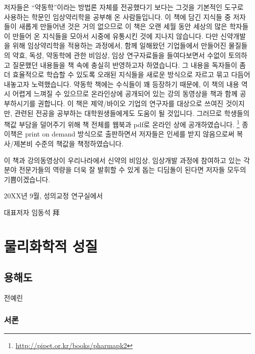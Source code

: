 \documentclass[
  11pt,
  krantz2, a4paper, twoside]{krantz}
\begin{document}
저자들은 ``약동학''이라는 방법론 자체를 전공했다기 보다는 그것을 기본적인
도구로 사용하는 학문인 임상약리학을 공부해 온 사람들입니다. 이 책에 담긴
지식들 중 저자들이 새롭게 만들어낸 것은 거의 없으므로 이 책은 오랜 세월
동안 세상의 많은 학자들이 만들어 온 지식들을 모아서 시중에 유통시킨 것에
지나지 않습니다. 다만 신약개발을 위해 임상약리학을 적용하는 과정에서,
함께 일해왔던 기업들에서 만들어진 물질들의 약효, 독성, 약동학에 관한
비임상, 임상 연구자료들을 들여다보면서 수없이 토의하고 질문했던 내용들을
책 속에 충실히 반영하고자 하였습니다. 그 내용을 독자들이 좀 더
효율적으로 학습할 수 있도록 오래된 지식들을 새로운 방식으로 자르고 묶고
다듬어 내놓고자 노력했습니다. 약동학 책에는 수식들이 꽤 등장하기 때문에, 이 책의 내용 역시 어렵게 느껴질 수 있으므로 온라인상에 공개되어 있는 강의 동영상을 책과 함께 공부하시기를 권합니다.
이 책은 제약/바이오 기업의 연구자를 대상으로 쓰여진 것이지만, 관련된 전공을 공부하는 대학원생들에게도 도움이 될 것입니다.
그러므로 학생들의 책값 부담을 덜어주기 위해 책 전체를 웹북과 pdf로 온라인 상에 공개하였습니다. \footnote{\url{http://pipet.or.kr/books/pharmapk2}}
종이책은 print on demand 방식으로 출판하면서 저자들은 인세를 받지 않음으로써 복사/제본비 수준의 책값을 책정하였습니다.

이 책과 강의동영상이 우리나라에서 신약의 비임상, 임상개발 과정에 참여하고 있는 각 분야 전문가들의 역량을 더욱 잘 발휘할 수 있게 돕는 디딤돌이 된다면 저자들 모두의 기쁨이겠습니다.

\hfill 20XX년 9월, 성의교정 연구실에서

\hfill 대표저자 임동석 拜

\normalsize

\mainmatter

\hypertarget{part-uxbb3cuxb9acuxd654uxd559uxc801-uxc131uxc9c8}{%
\part{물리화학적 성질}\label{part-uxbb3cuxb9acuxd654uxd559uxc801-uxc131uxc9c8}}

\hypertarget{uxc6a9uxd574uxb3c4}{%
\chapter{용해도}\label{uxc6a9uxd574uxb3c4}}

\Large\hfill

전예린
\normalsize

\hypertarget{uxc11cuxb860}{%
\section{서론}\label{uxc11cuxb860}}
\end{document}
